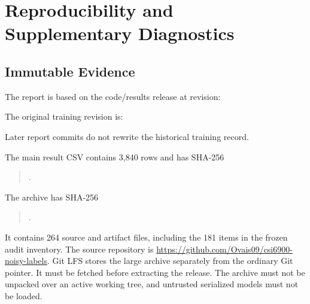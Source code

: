\chapter{Reproducibility and Supplementary Diagnostics}
\section{Immutable Evidence}
The report is based on the code/results release at revision:
\begin{quote}\small{}\end{quote}
The original training revision is:
\begin{quote}\small{}\end{quote}
Later report commits do not
rewrite the historical training record.

The main result CSV contains 3,840 rows and has SHA-256
\begin{quote}\small\ttfamily
{}.
\end{quote}
The archive  has SHA-256
\begin{quote}\small\ttfamily
{}.
\end{quote}
It contains 264 source and artifact files, including the 181 items in the
frozen audit inventory. The source repository is
\url{https://github.com/Ovais09/csi6900-noisy-labels}. Git LFS stores the large
archive separately from the ordinary Git pointer. It must be fetched before
extracting the release. The archive must not be unpacked over an active
working tree, and untrusted serialized models must not be loaded.

